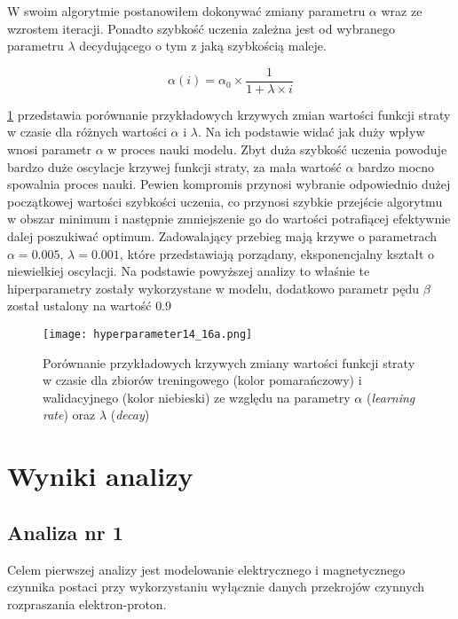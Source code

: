 \documentclass[11pt]{book}
\theoremstyle{definition}
\begin{document}
W swoim algorytmie postanowiłem dokonywać zmiany parametru $\alpha$ wraz ze wzrostem iteracji. Ponadto szybkość uczenia zależna jest od wybranego parametru $\lambda$ decydującego o tym z jaką szybkością maleje.

\begin{equation}
\alpha(i) = \alpha_0 \times \frac{1}{1 + \lambda \times i}
\end{equation}

\figurename{} \ref{fig:hyperparameters} przedstawia porównanie przykładowych krzywych zmian wartości funkcji straty w czasie dla różnych wartości $\alpha$ i $\lambda$. Na ich podstawie widać jak duży wpływ wnosi parametr $\alpha$ w proces nauki modelu. Zbyt duża szybkość uczenia powoduje bardzo duże oscylacje krzywej funkcji straty, za mała wartość $\alpha$ bardzo mocno spowalnia proces nauki. Pewien kompromis przynosi wybranie odpowiednio dużej początkowej wartości szybkości uczenia, co przynosi szybkie przejście algorytmu w obszar minimum i następnie zmniejszenie go do wartości potrafiącej efektywnie dalej poszukiwać optimum. Zadowalający przebieg mają krzywe o parametrach $\alpha = 0.005$, $\lambda = 0.001$, które przedstawiają porządany, eksponencjalny kształt o niewielkiej oscylacji. Na podstawie powyższej analizy to właśnie te hiperparametry zostały wykorzystane w modelu, dodatkowo parametr pędu $\beta$ został ustalony na wartość $0.9$


\begin{figure}[htp!]
	\centering
	\texttt{[image: hyperparameter14\_16a.png]}
	\caption{Porównanie przykładowych krzywych zmiany wartości funkcji straty w czasie dla zbiorów treningowego (kolor pomarańczowy) i walidacyjnego (kolor niebieski) ze względu na parametry $\alpha$ (\textit{learning rate}) oraz $\lambda$ (\textit{decay})}
	\label{fig:hyperparameters}
\end{figure}


\chapter{Wyniki analizy}

\section{Analiza nr 1}
%
Celem pierwszej analizy jest modelowanie elektrycznego i magnetycznego czynnika postaci przy wykorzystaniu wyłącznie danych przekrojów czynnych rozpraszania elektron-proton.
\end{document}
